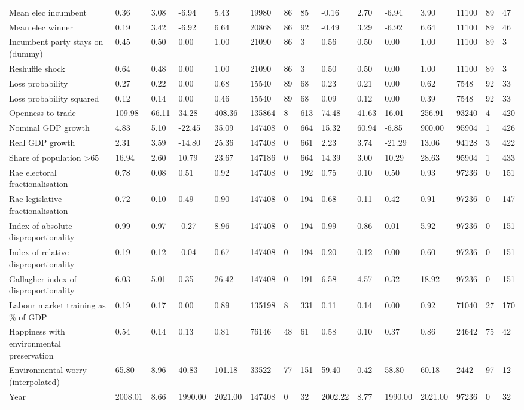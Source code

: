 \begin{longtable}{lllllllllllllll}
Mean elec incumbent & 0.36 & 3.08 & -6.94 & 5.43 & 19980 & 86 & 85 & -0.16 & 2.70 & -6.94 & 3.90 & 11100 & 89 & 47\\
Mean elec winner & 0.19 & 3.42 & -6.92 & 6.64 & 20868 & 86 & 92 & -0.49 & 3.29 & -6.92 & 6.64 & 11100 & 89 & 46\\
Incumbent party stays on (dummy) & 0.45 & 0.50 & 0.00 & 1.00 & 21090 & 86 & 3 & 0.56 & 0.50 & 0.00 & 1.00 & 11100 & 89 & 3\\
Reshuffle shock & 0.64 & 0.48 & 0.00 & 1.00 & 21090 & 86 & 3 & 0.50 & 0.50 & 0.00 & 1.00 & 11100 & 89 & 3\\
\addlinespace
Loss probability & 0.27 & 0.22 & 0.00 & 0.68 & 15540 & 89 & 68 & 0.23 & 0.21 & 0.00 & 0.62 & 7548 & 92 & 33\\
Loss probability squared & 0.12 & 0.14 & 0.00 & 0.46 & 15540 & 89 & 68 & 0.09 & 0.12 & 0.00 & 0.39 & 7548 & 92 & 33\\
Openness to trade & 109.98 & 66.11 & 34.28 & 408.36 & 135864 & 8 & 613 & 74.48 & 41.63 & 16.01 & 256.91 & 93240 & 4 & 420\\
Nominal GDP growth & 4.83 & 5.10 & -22.45 & 35.09 & 147408 & 0 & 664 & 15.32 & 60.94 & -6.85 & 900.00 & 95904 & 1 & 426\\
Real GDP growth & 2.31 & 3.59 & -14.80 & 25.36 & 147408 & 0 & 661 & 2.23 & 3.74 & -21.29 & 13.06 & 94128 & 3 & 422\\
\addlinespace
Share of population >65 & 16.94 & 2.60 & 10.79 & 23.67 & 147186 & 0 & 664 & 14.39 & 3.00 & 10.29 & 28.63 & 95904 & 1 & 433\\
Rae electoral fractionalisation & 0.78 & 0.08 & 0.51 & 0.92 & 147408 & 0 & 192 & 0.75 & 0.10 & 0.50 & 0.93 & 97236 & 0 & 151\\
Rae legislative fractionalisation & 0.72 & 0.10 & 0.49 & 0.90 & 147408 & 0 & 194 & 0.68 & 0.11 & 0.42 & 0.91 & 97236 & 0 & 147\\
Index of absolute disproportionality & 0.99 & 0.97 & -0.27 & 8.96 & 147408 & 0 & 194 & 0.99 & 0.86 & 0.01 & 5.92 & 97236 & 0 & 151\\
Index of relative disproportionality & 0.19 & 0.12 & -0.04 & 0.67 & 147408 & 0 & 194 & 0.20 & 0.12 & 0.00 & 0.60 & 97236 & 0 & 151\\
\addlinespace
Gallagher index of disproportionality & 6.03 & 5.01 & 0.35 & 26.42 & 147408 & 0 & 191 & 6.58 & 4.57 & 0.32 & 18.92 & 97236 & 0 & 151\\
Labour market training as \% of GDP & 0.19 & 0.17 & 0.00 & 0.89 & 135198 & 8 & 331 & 0.11 & 0.14 & 0.00 & 0.92 & 71040 & 27 & 170\\
Happiness with environmental preservation & 0.54 & 0.14 & 0.13 & 0.81 & 76146 & 48 & 61 & 0.58 & 0.10 & 0.37 & 0.86 & 24642 & 75 & 42\\
Environmental worry (interpolated) & 65.80 & 8.96 & 40.83 & 101.18 & 33522 & 77 & 151 & 59.40 & 0.42 & 58.80 & 60.18 & 2442 & 97 & 12\\
Year & 2008.01 & 8.66 & 1990.00 & 2021.00 & 147408 & 0 & 32 & 2002.22 & 8.77 & 1990.00 & 2021.00 & 97236 & 0 & 32\\
\bottomrule
\end{longtable}

